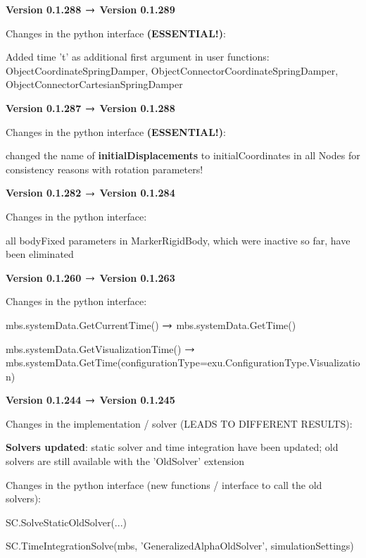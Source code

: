 	\item {\bf Version 0.1.288 $\rightarrow$ Version 0.1.289}
	\item[] Changes in the python interface {\bf (ESSENTIAL!)}:
	\bi \ttfamily
	  \item Added time 't' as additional first argument in user functions: ObjectCoordinateSpringDamper, ObjectConnectorCoordinateSpringDamper, ObjectConnectorCartesianSpringDamper
	\ei
	\item {\bf Version 0.1.287 $\rightarrow$ Version 0.1.288}
	\item[] Changes in the python interface {\bf (ESSENTIAL!)}:
	\bi \ttfamily
	  \item changed the name of {\bf initialDisplacements} to {initialCoordinates} in all Nodes for consistency reasons with rotation parameters!
	\ei
	\item {\bf Version 0.1.282 $\rightarrow$ Version 0.1.284}
	\item[] Changes in the python interface:
	\bi \ttfamily
	  \item all bodyFixed parameters in MarkerRigidBody, which were inactive so far, have been eliminated
	\ei
	\item {\bf Version 0.1.260 $\rightarrow$ Version 0.1.263}
	\item[] Changes in the python interface:
	\bi \ttfamily
	  \item mbs.systemData.GetCurrentTime() $\rightarrow$ mbs.systemData.GetTime()
	  \item mbs.systemData.GetVisualizationTime() $\rightarrow$ mbs.systemData.GetTime(configurationType=exu.ConfigurationType.Visualization)
	\ei
	\item {\bf Version 0.1.244 $\rightarrow$ Version 0.1.245}
	\item[] Changes in the implementation / solver (LEADS TO DIFFERENT RESULTS):
	\bi
	  \item {\bf Solvers updated}: static solver and time integration have been updated; old solvers are still available with the 'OldSolver' extension
	\ei
	\item[] Changes in the python interface (new functions / interface to call the old solvers):
	\bi \ttfamily
	  \item SC.SolveStaticOldSolver(...)
	  \item SC.TimeIntegrationSolve(mbs, 'GeneralizedAlphaOldSolver', simulationSettings) 
